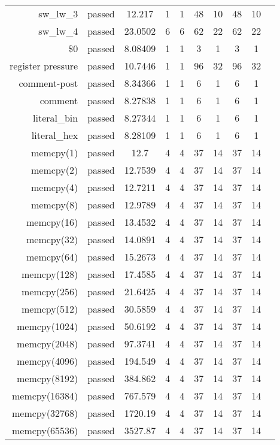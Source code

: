 \begin{longtable}{r|ccccccccc}
    sw\_lw\_3 & passed & 12.217 & 1 & 1 & 48 & 10 & 48 & 10 \\
    sw\_lw\_4 & passed & 23.0502 & 6 & 6 & 62 & 22 & 62 & 22 \\
    \$0 & passed & 8.08409 & 1 & 1 & 3 & 1 & 3 & 1 \\
    register pressure & passed & 10.7446 & 1 & 1 & 96 & 32 & 96 & 32 \\
    comment-post & passed & 8.34366 & 1 & 1 & 6 & 1 & 6 & 1 \\
    comment & passed & 8.27838 & 1 & 1 & 6 & 1 & 6 & 1 \\
    literal\_bin & passed & 8.27344 & 1 & 1 & 6 & 1 & 6 & 1 \\
    literal\_hex & passed & 8.28109 & 1 & 1 & 6 & 1 & 6 & 1 \\
    memcpy(1) & passed & 12.7 & 4 & 4 & 37 & 14 & 37 & 14 \\
    memcpy(2) & passed & 12.7539 & 4 & 4 & 37 & 14 & 37 & 14 \\
    memcpy(4) & passed & 12.7211 & 4 & 4 & 37 & 14 & 37 & 14 \\
    memcpy(8) & passed & 12.9789 & 4 & 4 & 37 & 14 & 37 & 14 \\
    memcpy(16) & passed & 13.4532 & 4 & 4 & 37 & 14 & 37 & 14 \\
    memcpy(32) & passed & 14.0891 & 4 & 4 & 37 & 14 & 37 & 14 \\
    memcpy(64) & passed & 15.2673 & 4 & 4 & 37 & 14 & 37 & 14 \\
    memcpy(128) & passed & 17.4585 & 4 & 4 & 37 & 14 & 37 & 14 \\
    memcpy(256) & passed & 21.6425 & 4 & 4 & 37 & 14 & 37 & 14 \\
    memcpy(512) & passed & 30.5859 & 4 & 4 & 37 & 14 & 37 & 14 \\
    memcpy(1024) & passed & 50.6192 & 4 & 4 & 37 & 14 & 37 & 14 \\
    memcpy(2048) & passed & 97.3741 & 4 & 4 & 37 & 14 & 37 & 14 \\
    memcpy(4096) & passed & 194.549 & 4 & 4 & 37 & 14 & 37 & 14 \\
    memcpy(8192) & passed & 384.862 & 4 & 4 & 37 & 14 & 37 & 14 \\
    memcpy(16384) & passed & 767.579 & 4 & 4 & 37 & 14 & 37 & 14 \\
    memcpy(32768) & passed & 1720.19 & 4 & 4 & 37 & 14 & 37 & 14 \\
    memcpy(65536) & passed & 3527.87 & 4 & 4 & 37 & 14 & 37 & 14 \\

\end{longtable}
